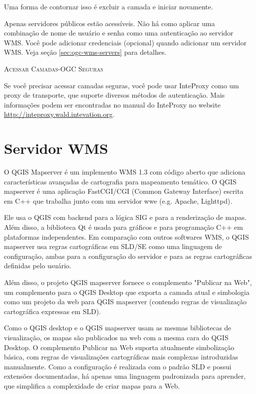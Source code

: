 Uma forma de contornar isso é excluir a camada e iniciar novamente.


Apenas servidores públicos estão acessíveis.
Não há como aplicar uma combinação de nome de usuário e senha como uma autenticação ao servidor WMS. Você pode adicionar credenciais (opcional) quando adicionar um servidor WMS. Veja seção \ref{sec:ogc-wms-servers} para detalhes.

\begin{Tip}[ht]\caption{\textsc{Acessar Camadas-OGC Seguras}}
Se você precisar acessar camadas seguras, você pode usar InteProxy como um proxy de transporte, que suporte diversos métodos de autenticação. Mais informações podem ser encontradas no manual do InteProxy no website \url{http://inteproxy.wald.intevation.org}.
\end{Tip}

%
%

\section{Servidor WMS}\label{sec:ogc-wmsserver}

O QGIS Mapserver é um implemento WMS 1.3 com código aberto que adiciona características avançadas de cartografia para mapeamento temático. O QGIS mapserver é uma aplicação FastCGI/CGI (Common Gateway Interface) escrita em C++ que trabalha junto com um servidor wwe (e.g. Apache, Lighttpd).

Ele usa o QGIS com backend para a lógica SIG e para a renderização de mapas. Além disso, a biblioteca Qt é usada para gráficos e para programação C++ em plataformas independentes. Em comparação com outros softwares WMS, o QGIS mapserver usa regras cartográficas em SLD/SE como uma linguagem de configuração, ambas para a configuração do servidor e para as regras cartográficas definidas pelo usuário.

Além disso, o projeto QGIS mapserver fornece o complemento "Publicar na Web", um complemento para o QGIS Desktop que exporta a camada atual e simbologia como um projeto da web para QGIS mapserver (contendo regras de visualização cartográfica expressas em SLD).

Como o QGIS desktop e o QGIS mapserver usam as mesmas bibliotecas de visualização, os mapas são publicados na web com a mesma cara do QGIS Desktop. O complemento Publicar na Web suporta atualmente simbolização básica, com regras de visualizações cartográficas mais complexas introduzidas manualmente. Como a configuração é realizada com o padrão SLD e possui extensões documentadas, há apenas uma linguagem padronizada para aprender, que simplifica a complexidade de criar mapas para a Web.


